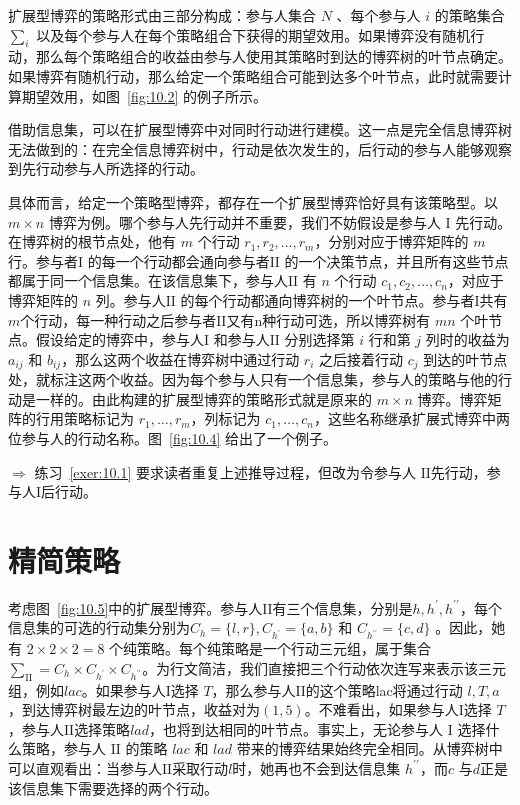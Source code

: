 扩展型博弈的策略形式由三部分构成：参与人集合 \(N\) 、每个参与人 \(i\) 的策略集合 \({\sum }_{i}\) 以及每个参与人在每个策略组合下获得的期望效用。如果博弈没有随机行动，那么每个策略组合的收益由参与人使用其策略时到达的博弈树的叶节点确定。如果博弈有随机行动，那么给定一个策略组合可能到达多个叶节点，此时就需要计算期望效用，如图~\ref{fig:10.2} 的例子所示。

借助信息集，可以在扩展型博弈中对同时行动进行建模。这一点是完全信息博弈树无法做到的：在完全信息博弈树中，行动是依次发生的，后行动的参与人能够观察到先行动参与人所选择的行动。

具体而言，给定一个策略型博弈，都存在一个扩展型博弈恰好具有该策略型。以 \(m \times  n\) 博弈为例。哪个参与人先行动并不重要，我们不妨假设是参与人 \(\mathrm{I}\) 先行动。在博弈树的根节点处，他有 \(m\) 个行动 \({r}_{1},{r}_{2},\ldots ,{r}_{m}\)，分别对应于博弈矩阵的 \(m\) 行。参与者\(\mathrm{I}\) 的每一个行动都会通向参与者\(\mathrm{II}\) 的一个决策节点，并且所有这些节点都属于同一个信息集。在该信息集下，参与人\(\mathrm{II}\) 有 \(n\) 个行动 \({c}_{1},{c}_{2},\ldots ,{c}_{n}\)，对应于博弈矩阵的 \(n\) 列。参与人\(\mathrm{II}\) 的每个行动都通向博弈树的一个叶节点。参与者\(\mathrm{I}\)共有$m$个行动，每一种行动之后参与者\(\mathrm{II}\)又有n种行动可选，所以博弈树有 \({mn}\) 个叶节点。假设给定的博弈中，参与人\(\mathrm{I}\) 和参与人\(\mathrm{II}\) 分别选择第 \(i\) 行和第 \(j\) 列时的收益为 \({a}_{ij}\) 和 \({b}_{ij}\)，那么这两个收益在博弈树中通过行动 \({r}_{i}\) 之后接着行动 \({c}_{j}\) 到达的叶节点处，就标注这两个收益。因为每个参与人只有一个信息集，参与人的策略与他的行动是一样的。由此构建的扩展型博弈的策略形式就是原来的 \(m \times  n\) 博弈。博弈矩阵的行用策略标记为 \({r}_{1},\ldots ,{r}_{m}\)，列标记为 \({c}_{1},\ldots ,{c}_{n}\)，这些名称继承扩展式博弈中两位参与人的行动名称。图~\ref{fig:10.4} 给出了一个例子。

\(\Rightarrow\) 练习~\ref{exer:10.1} 要求读者重复上述推导过程，但改为令参与人 \(\mathrm{II}\)先行动，参与人\(\mathrm{I}\)后行动。

\section{精简策略}\label{sec10.5}

考虑图~\ref{fig:10.5}中的扩展型博弈。参与人$\mathrm{II}$有三个信息集，分别是\(h,{h}^{\prime},{h}^{\prime \prime}\)，每个信息集的可选的行动集分别为\({C}_{h} = \{ l,r\} ,{C}_{{h}^{\prime}} = \{ a,b\}\) 和 \({C}_{{h}^{\prime \prime}} = \{ c,d\}\) 。因此，她有 \(2 \times  2 \times  2 = 8\) 个纯策略。每个纯策略是一个行动三元组，属于集合\({\sum }_{\mathrm{{II}}} = {C}_{h} \times  {C}_{{h}^{\prime }} \times  {C}_{{h}^{\prime \prime }}\)。为行文简洁，我们直接把三个行动依次连写来表示该三元组，例如$lac$。如果参与人$\mathrm{I}$选择 \(T\)，那么参与人$\mathrm{II}$的这个策略lac将通过行动 \(l,T,a\)，到达博弈树最左边的叶节点，收益对为$(1,5)$。不难看出，如果参与人$\mathrm{I}$选择 \(T\)，参与人$\mathrm{II}$选择策略$lad$，也将到达相同的叶节点。事实上，无论参与人 \(\mathrm{I}\) 选择什么策略，参与人 \(\mathrm{{II}}\) 的策略 \({lac}\) 和 \({lad}\) 带来的博弈结果始终完全相同。从博弈树中可以直观看出：当参与人$\mathrm{II}$采取行动\(l\)时，她再也不会到达信息集 \({h}^{\prime \prime }\)，而\(c\) 与\(d\)正是该信息集下需要选择的两个行动。

